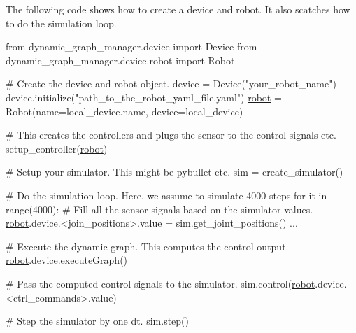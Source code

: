The following code shows how to create a device and robot. It also scatches how to do the simulation loop. 
\begin{DoxyCode}
from dynamic\_graph\_manager.device \textcolor{keyword}{import} Device
from dynamic\_graph\_manager.device.robot \textcolor{keyword}{import} Robot

\textcolor{preprocessor}{# Create the device and robot object.}
device = Device(\textcolor{stringliteral}{"your\_robot\_name"})
device.initialize("path\_to\_the\_robot\_yaml\_file.yaml")
\hyperlink{namespacerobot}{robot} = Robot(name=local\_device.name, device=local\_device)

\textcolor{preprocessor}{# This creates the controllers and plugs the sensor to the control signals etc.}
setup\_controller(\hyperlink{namespacerobot}{robot})

\textcolor{preprocessor}{# Setup your simulator. This might be pybullet etc.}
sim = create\_simulator()

\textcolor{preprocessor}{# Do the simulation loop. Here, we assume to simulate 4000 steps}
\textcolor{keywordflow}{for} it in range(4000):
  # Fill all the sensor signals based on the simulator values.
  \hyperlink{namespacerobot}{robot}.device.<join\_positions>.value = sim.get\_joint\_positions()
  ...

  # Execute the dynamic graph. This computes the control output.
  \hyperlink{namespacerobot}{robot}.device.executeGraph()

  # Pass the computed control signals to the simulator.
  sim.control(\hyperlink{namespacerobot}{robot}.device.<ctrl\_commands>.value)

  # Step the simulator by one dt.
  sim.step()
\end{DoxyCode}
 